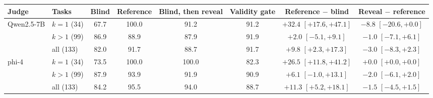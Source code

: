 \begin{tabular}{llcccccc}
\toprule
Judge & Tasks & Blind & Reference & Blind, then reveal & Validity gate & Reference $-$ blind & Reveal $-$ reference \\
\midrule
Qwen2.5-7B & $k{=}1$ (34) & 67.7 & 100.0 & 91.2 & 91.2 & $+32.4$ {\scriptsize$[+17.6,+47.1]$} & $-8.8$ {\scriptsize$[-20.6,+0.0]$} \\
 & $k{>}1$ (99) & 86.9 & 88.9 & 87.9 & 91.9 & $+2.0$ {\scriptsize$[-5.1,+9.1]$} & $-1.0$ {\scriptsize$[-7.1,+6.1]$} \\
 & all (133) & 82.0 & 91.7 & 88.7 & 91.7 & $+9.8$ {\scriptsize$[+2.3,+17.3]$} & $-3.0$ {\scriptsize$[-8.3,+2.3]$} \\
\addlinespace
phi-4 & $k{=}1$ (34) & 73.5 & 100.0 & 100.0 & 82.3 & $+26.5$ {\scriptsize$[+11.8,+41.2]$} & $+0.0$ {\scriptsize$[+0.0,+0.0]$} \\
 & $k{>}1$ (99) & 87.9 & 93.9 & 91.9 & 90.9 & $+6.1$ {\scriptsize$[-1.0,+13.1]$} & $-2.0$ {\scriptsize$[-6.1,+2.0]$} \\
 & all (133) & 84.2 & 95.5 & 94.0 & 88.7 & $+11.3$ {\scriptsize$[+5.2,+18.1]$} & $-1.5$ {\scriptsize$[-4.5,+1.5]$} \\
\bottomrule
\end{tabular}
